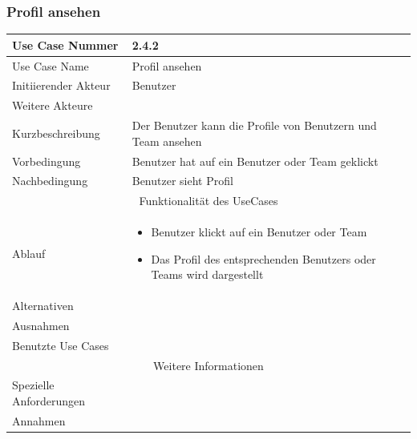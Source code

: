 \documentclass[10pt,a4paper]{article}
\begin{document}
\subsubsection{Profil ansehen}
		\begin{tabular}{|l|p{.5\linewidth}|}
		\hline Use Case Nummer & 2.4.2 \\ 
		\hline Use Case Name & Profil ansehen \\ 
		\hline Initiierender Akteur & Benutzer \\
		\hline Weitere Akteure &  \\
		\hline Kurzbeschreibung & Der Benutzer kann die Profile von Benutzern und Team ansehen \\
		\hline Vorbedingung & Benutzer hat auf ein Benutzer oder Team geklickt \\
		\hline Nachbedingung & Benutzer sieht Profil \\
		\hline \multicolumn{2}{|c|}{Funktionalität des UseCases}\\
		\hline Ablauf & \begin{itemize}
			\item Benutzer klickt auf ein Benutzer oder Team
			\item Das Profil des entsprechenden Benutzers oder Teams wird dargestellt
		\end{itemize} \\
		\hline Alternativen &  \\
		\hline Ausnahmen &  \\
		\hline Benutzte Use Cases &  \\
		\hline \multicolumn{2}{|c|}{Weitere Informationen} \\
		\hline Spezielle Anforderungen &  \\
		\hline Annahmen &  \\
		\hline
		\end{tabular}
\end{document}
